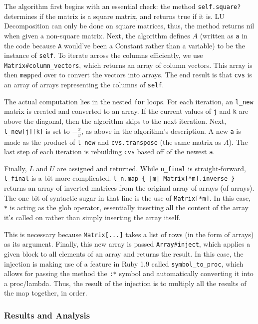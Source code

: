 \documentclass[letterpaper,11pt]{article}
\begin{document}
The algorithm first begins with an essential check: the method \texttt{self.square?} determines if the matrix is a square matrix,
and returns true if it is.
LU Decomposition can only be done on square matrices, thus, the method returns nil when given a non-square matrix.
Next, the algorithm defines $A$ (written as \texttt{a} in the code because \texttt{A} would've been a Constant rather than a variable)
to be the instance of \texttt{self}.
To iterate across the columns efficiently, we use \texttt{Matrix\#column\_vectors}, which returns an array of column vectors.
This array is then \texttt{map}ped over to convert the vectors into arrays.
The end result is that \texttt{cvs} is an array of arrays representing the columns of \texttt{self}.

The actual computation lies in the nested \texttt{for} loops.
For each iteration, an \texttt{l\_new} matrix is created and converted to an array.
If the current values of \texttt{j} and \texttt{k} are above the diagonal, then the algorithm skips to the next iteration.
Next, \texttt{l\_new[j][k]} is set to $-\frac{x}{y}$, as above in the algorithm's description.
A new \texttt{a} is made as the product of \texttt{l\_new} and \texttt{cvs.transpose} (the same matrix as $A$).
The last step of each iteration is rebuilding \texttt{cvs} based off of the newest \texttt{a}.

Finally, $L$ and $U$ are assigned and returned.
While \texttt{u\_final} is straight-forward, \texttt{l\_final} is a bit more complicated.
\texttt{l\_n.map \{ |m| Matrix[*m].inverse \}} returns an array of inverted matrices from the original array of arrays (of arrays).
The one bit of syntactic sugar in that line is the use of \texttt{Matrix[*m]}.
In this case, \texttt{*} is acting as the glob operator, essentially inserting all the content of the array it's called on rather
than simply inserting the array itself.

This is necessary because \texttt{Matrix[...]} takes a list of rows (in the form of arrays) as its argument.
Finally, this new array is passed \texttt{Array\#inject}, which applies a given block to all elements of an array and returns the result.
In this case, the injection is making use of a feature in Ruby 1.9 called \texttt{symbol\_to\_proc}, which allows for passing
the method the \texttt{:*} symbol and automatically converting it into a proc/lambda.
Thus, the result of the injection is to multiply all the results of the map together, in order.


\subsubsection{Results and Analysis}
\end{document}
